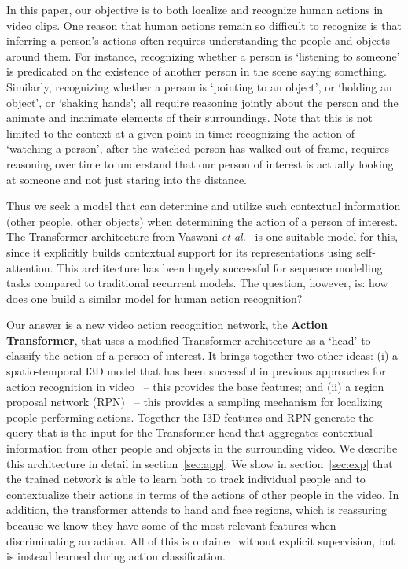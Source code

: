 \documentclass[10pt,twocolumn,letterpaper]{article}
\newcommand{\Tx}[0]{Action Transformer}
\begin{document}
In this paper, our objective is to both localize and recognize human actions in video clips. 
One reason that human actions remain so difficult to recognize
is that inferring a person's actions often requires understanding the
people and objects around them.  
For instance, recognizing whether a person is `listening to someone'
is predicated on the existence of another person in the scene 
saying something.  Similarly, recognizing whether a person is
`pointing to an object', or `holding an object', or `shaking hands';
all require reasoning jointly about the person and the
animate and inanimate elements of their surroundings. Note that this
is not limited to the context at a given point in time: recognizing
the action of `watching a person', after the watched person has walked out of
frame,  requires reasoning over time to understand that our
person of interest is actually looking at someone and not just staring
into the distance.


Thus we seek a model that can determine and utilize such contextual
information (other people, other objects) when determining the action
of a person of interest. The Transformer architecture from Vaswani
{\it et al.}~\cite{vaswani2017attention} is one suitable model for
this, since it explicitly builds contextual support for its
representations using self-attention.  This architecture has been
hugely successful for sequence modelling tasks
compared to traditional recurrent models.
The question, however, is: how does one build a similar model for human action
recognition?

Our answer is a new video action recognition network, the {\bf \Tx{}}, that
uses a modified Transformer architecture as a `head' to classify the action of
a person of interest. It brings together two other ideas: (i) a
spatio-temporal I3D model that has been successful in previous
approaches for action recognition in video~\cite{carreira2017quo} --
this provides the base features; and (ii) a region proposal network
(RPN)~\cite{ren2015faster} -- this provides a sampling mechanism for localizing people performing actions. Together the I3D features
and RPN generate the query that is the input for the
Transformer head that
aggregates contextual information from other people and objects in the
surrounding video. We describe this architecture in detail in section~\ref{sec:app}.
We show in section~\ref{sec:exp} that the trained network 
 is able to learn both to track individual people and to contextualize their actions in terms of the actions of other people in the video. In addition, the transformer attends to hand and face regions, which is reassuring because we know they have some of the most relevant features
 when discriminating an action. All of this is obtained without explicit supervision, but is instead
learned during action classification.
\end{document}
